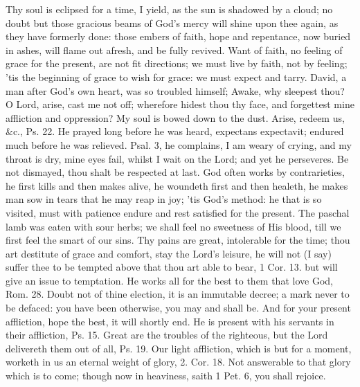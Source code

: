 {Thy soul is eclipsed for a time, I yield, as the sun is shadowed by a
cloud; no doubt but those gracious beams of God's mercy will shine upon
thee again, as they have formerly done: those embers of faith, hope and
repentance, now buried in ashes, will flame out afresh, and be fully
revived. Want of faith, no feeling of grace for the present, are not
fit directions; we must live by faith, not by feeling; 'tis the
beginning of grace to wish for grace: we must expect and tarry. David,
a man after God's own heart, was so troubled himself; Awake, why
sleepest thou? O Lord, arise, cast me not off; wherefore hidest thou
thy face, and forgettest mine affliction and oppression? My soul is
bowed down to the dust. Arise, redeem us, \&c., Ps.  22. He prayed
long before he was heard, expectans expectavit; endured much before he
was relieved. Psal.  3, he complains, I am weary of crying, and my
throat is dry, mine eyes fail, whilst I wait on the Lord; and yet he
perseveres. Be not dismayed, thou shalt be respected at last. God often
works by contrarieties, he first kills and then makes alive, he
woundeth first and then healeth, he makes man sow in tears that he may
reap in joy; 'tis God's method: he that is so visited, must with
patience endure and rest satisfied for the present. The paschal lamb
was eaten with sour herbs; we shall feel no sweetness of His blood,
till we first feel the smart of our sins. Thy pains are great,
intolerable for the time; thou art destitute of grace and comfort, stay
the Lord's leisure, he will not (I say) suffer thee to be tempted above
that thou art able to bear, 1 Cor.  13. but will give an issue to
temptation. He works all for the best to them that love God, Rom. 
28. Doubt not of thine election, it is an immutable decree; a mark
never to be defaced: you have been otherwise, you may and shall be. And
for your present affliction, hope the best, it will shortly end. He is
present with his servants in their affliction, Ps.  15. Great are
the troubles of the righteous, but the Lord delivereth them out of all,
Ps.  19. Our light affliction, which is but for a moment, worketh
in us an eternal weight of glory, 2. Cor.  18. Not answerable to
that glory which is to come; though now in heaviness, saith 1 Pet. 
6, you shall rejoice.

}
